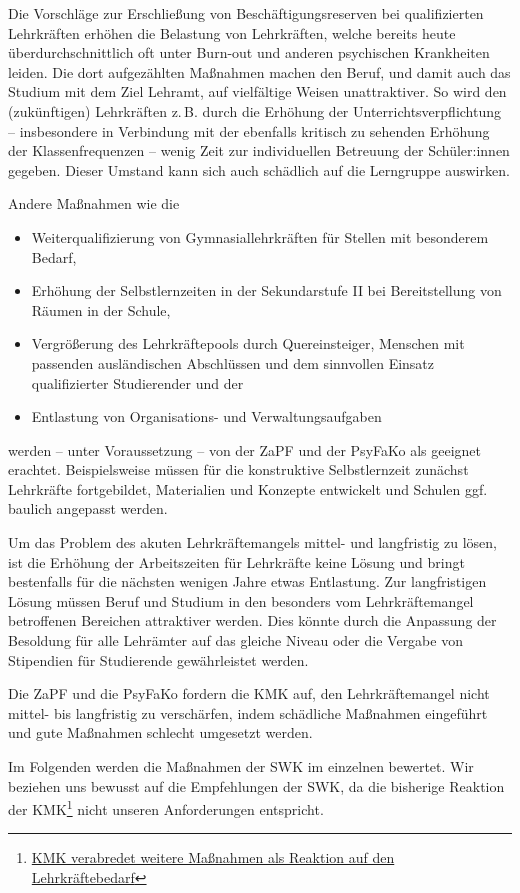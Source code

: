 \documentclass[DIV=calc]{scrartcl}
\let\oldgrqq=\grqq
\def\grqq{\oldgrqq\xspace}
\begin{document}
Die Vorschläge zur \glqq Erschließung von Beschäftigungsreserven bei qualifizierten Lehrkräften\grqq erhöhen die Belastung von Lehrkräften, welche bereits heute überdurchschnittlich oft unter Burn-out und anderen psychischen Krankheiten leiden. Die dort aufgezählten Maßnahmen machen den Beruf, und damit auch das Studium mit dem Ziel Lehramt, auf vielfältige Weisen unattraktiver. %
So wird den (zukünftigen) Lehrkräften z.\,B. durch die Erhöhung der Unterrichtsverpflichtung -- insbesondere in Verbindung mit der ebenfalls kritisch zu sehenden Erhöhung der Klassenfrequenzen -- wenig Zeit zur individuellen Betreuung der Schüler:innen gegeben.
Dieser Umstand kann sich auch schädlich auf die Lerngruppe auswirken. 

Andere Maßnahmen wie die
\begin{itemize}
    \item Weiterqualifizierung von Gymnasiallehrkräften für Stellen mit besonderem Bedarf,
    \item Erhöhung der Selbstlernzeiten in der Sekundarstufe II bei Bereitstellung von Räumen in der Schule,
    \item Vergrößerung des Lehrkräftepools durch Quereinsteiger, Menschen mit passenden ausländischen Abschlüssen und dem sinnvollen Einsatz qualifizierter Studierender und der
    \item Entlastung von Organisations- und Verwaltungsaufgaben
\end{itemize}
werden -- unter Voraussetzung -- von der ZaPF und der PsyFaKo als geeignet erachtet. 
Beispielsweise müssen für die konstruktive Selbstlernzeit zunächst Lehrkräfte fortgebildet, Materialien und Konzepte entwickelt und Schulen ggf. baulich angepasst werden.

Um das Problem des akuten Lehrkräftemangels mittel- und langfristig zu lösen, ist die Erhöhung der Arbeitszeiten für Lehrkräfte keine Lösung und bringt bestenfalls für die nächsten wenigen Jahre
etwas Entlastung. 
Zur langfristigen Lösung müssen Beruf und Studium in den besonders vom Lehrkräftemangel betroffenen 
Bereichen attraktiver werden. Dies könnte durch die Anpassung der Besoldung für alle Lehrämter auf das gleiche Niveau oder die Vergabe von Stipendien für Studierende gewährleistet werden.

Die ZaPF und die PsyFaKo fordern die KMK auf, den Lehrkräftemangel nicht mittel- bis langfristig zu verschärfen, indem schädliche Maßnahmen eingeführt und gute Maßnahmen schlecht umgesetzt werden.

Im Folgenden werden die Maßnahmen der SWK im einzelnen bewertet. Wir beziehen uns bewusst auf die Empfehlungen der SWK, da die bisherige Reaktion der KMK\footnote{\href{https://www.kmk.org/aktuelles/artikelansicht/kmk-verabredet-weitere-massnahmen-als-reaktion-auf-den-lehrkraeftebedarf.html}{KMK verabredet weitere Maßnahmen als Reaktion auf den Lehrkräftebedarf}} nicht unseren Anforderungen entspricht.
\end{document}
